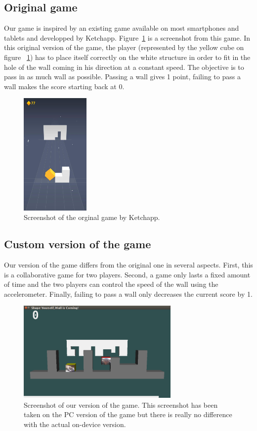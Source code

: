 \documentclass[english, DIV=13]{scrartcl}
\begin{document}
\subsection{Original game}
Our game is inspired by an existing game available on most smartphones and tablets
and developped by Ketchapp. Figure~\ref{fig:original-game} is a screenshot from this game.
In this original version of the game, the player (represented by the yellow cube on figure
~\ref{fig:original-game}) has to place itself correctly on the white structure in order
to fit in the hole of the wall coming in his direction at a constant speed. The objective
is to pass in as much wall as possible. Passing a wall gives 1 point, failing to pass a
wall makes the score starting back at 0.

\begin{figure}
    \centering
    \includegraphics[width=0.3\textwidth]{img/original-game}
    \caption{Screenshot of the orginal game by Ketchapp.}
    \label{fig:original-game}
\end{figure}

\subsection{Custom version of the game}
Our version of the game differs from the original one in several aspects. First, this
is a collaborative game for two players. Second, a game only lasts a fixed amount of time
and the two players can control the speed of the wall using the accelerometer.
Finally, failing to pass a wall only decreases the current score by 1. 

\begin{figure}
    \centering
    \includegraphics[width=0.7\textwidth]{img/custom-game-version}
    \caption{Screenshot of our version of the game. This screenshot has been taken
    on the PC version of the game but there is really no difference with the actual
    on-device version.}
    \label{fig:custom-game}
\end{figure}
\end{document}
